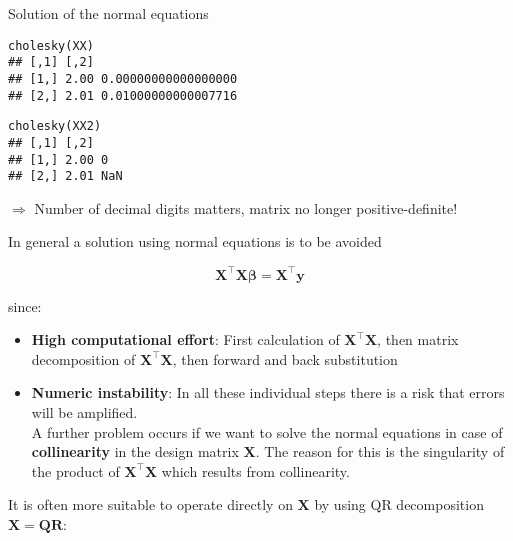 \documentclass[11pt,compress,t,notes=noshow, xcolor=table]{beamer}
\begin{document}
\begin{vbframe}{Solution of the normal equations}
\vspace{0.2cm}
\begin{verbatim}
cholesky(XX)
## [,1] [,2]
## [1,] 2.00 0.00000000000000000
## [2,] 2.01 0.01000000000007716
\end{verbatim}

\vspace{0.2cm}
\begin{verbatim}
cholesky(XX2)
## [,1] [,2]
## [1,] 2.00 0
## [2,] 2.01 NaN
\end{verbatim}


\normalsize



\vspace{0.4cm}
$\Rightarrow$ Number of decimal digits matters, matrix no longer positive-definite!

\framebreak

In general a solution using  normal equations is to be avoided

$$
\mathbf{X}^\top\mathbf{X}\boldsymbol{\beta} = \mathbf{X}^\top\mathbf{y}
$$

since:

\begin{itemize}
\item \textbf{High computational effort}: First calculation of $\bm{X}^\top\bm{X}$, then matrix decomposition of $\bm{X}^\top\bm{X}$, then forward and back substitution
\item \textbf{Numeric instability}: In all these individual steps there is a risk that errors will be amplified.\\
\medskip
A further problem occurs if we want to solve the normal equations in case of \textbf{collinearity} in the design matrix $\mathbf{X}$.
The reason for this is the singularity of the product of $\mathbf{X}^\top\mathbf{X}$ which results from collinearity.
\end{itemize}

It is often more suitable to operate directly on $\mathbf{X}$ by using QR decomposition $\mathbf{X} = \mathbf{QR}$:


\end{vbframe}
\end{document}
